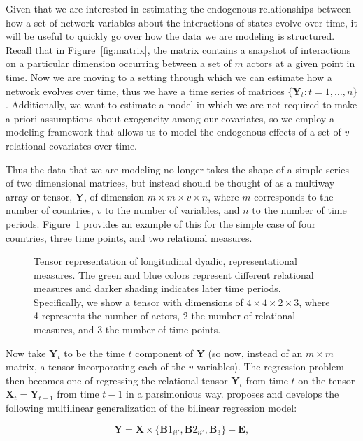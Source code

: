 \documentclass[3p,times,twocolumn,authoryear,12pt]{elsarticle}
\newcommand{\bl}[1]{{\mathbf #1}}
\begin{document}
Given that we are interested in estimating the endogenous relationships between how a set of network variables about the interactions of states evolve over time, it will be useful to quickly go over how the data we are modeling is structured. Recall that in Figure~\ref{fig:matrix}, the matrix contains a snapshot of interactions on a particular dimension occurring between a set of $m$ actors at a given point in time. Now we are moving to a setting through which we can estimate how a network evolves over time, thus we have a time series of matrices $\{{\bl Y}_t : t = 1, \ldots, n\}$. Additionally, we want to estimate a model in which we are not required to make a priori assumptions about exogeneity among our covariates, so we employ a modeling framework that allows us to model the endogenous effects of a set of $v$ relational covariates over time. 

Thus the data that we are modeling no longer takes the shape of a simple series of two dimensional matrices, but instead should be thought of as a multiway array or tensor, $\bl Y$, of dimension $m \times m \times v \times n$, where $m$ corresponds to the number of countries, $v$ to the number of variables, and $n$ to the number of time periods.  Figure~\ref{fig:tensViz} provides an example of this for the simple case of four countries, three time points, and two relational measures. 

\begin{figure}[ht]
	\centering
	\resizebox{.5\textwidth}{!}{}
	\caption{Tensor representation of longitudinal dyadic, representational measures. The green and blue colors represent different relational measures and darker shading indicates later time periods. Specifically, we show a tensor with dimensions of $4 \times 4 \times 2 \times 3$, where 4 represents the number of actors, 2 the number of relational measures, and 3 the number of time points.}
	\label{fig:tensViz}
\end{figure}

Now take $\bl Y_t$ to be the time $t$ component of $\bl Y$ (so now, instead of an $m\times m$ matrix, a tensor incorporating each of the $v$ variables). The regression problem then becomes one of regressing the relational tensor $\bl Y_t$ from time $t$ on the tensor $\bl X_t =\bl Y_{t-1}$ from time $t-1$ in a parsimonious way. \citet{hoff:2014} proposes and develops the following multilinear generalization of the bilinear regression model: 

\begin{equation}  
	\bl Y = \bl X \times \{ \bl B1_{ii'}, \bl B2_{ii'}, \bl B_3\} + \bl E ,  
	\label{eqn:mltr}
\end{equation}
\end{document}
